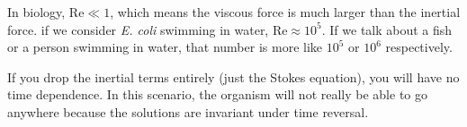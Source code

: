 \documentclass[a4paper,twoside,master.tex]{subfiles}
\begin{document}
In biology, $ \text{Re} \ll 1 $, which means the viscous force is much larger than the inertial force. if we consider \textit{E. coli} swimming in water, $ \text{Re} \approx 10^{5} $. If we talk about a fish or a person swimming in water, that number is more like $ 10^5 $ or $ 10^6 $ respectively.

If you drop the inertial terms entirely (just the Stokes equation), you will have no time dependence. In this scenario, the organism will not really be able to go anywhere because the solutions are invariant under time reversal.
\end{document}
